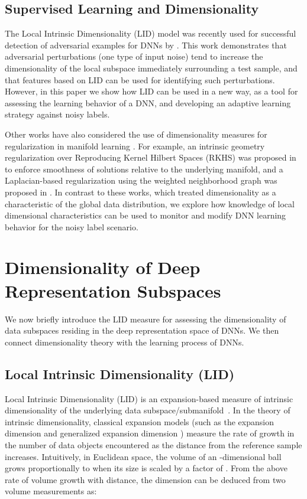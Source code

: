 \documentclass{article}
\begin{document}
\subsection{Supervised Learning and Dimensionality}

The Local Intrinsic Dimensionality (LID) model \cite{houle2017local1} was recently used for successful detection of adversarial examples for DNNs by \cite{ma2018characterizing}. This work demonstrates that adversarial perturbations (one type of input noise) tend to increase the dimensionality of the local subspace immediately surrounding a test sample, and that features based on LID can be used for identifying such perturbations.
However, in this paper we show how LID can be used in a new way, as a tool for assessing the learning behavior of a DNN, and developing an adaptive learning strategy against noisy labels.

Other works have also considered the use of dimensionality measures for regularization in manifold learning \cite{roweis2000nonlinear,belkin2004regularization,belkin2006manifold}. For example, an intrinsic geometry regularization over Reproducing Kernel Hilbert Spaces (RKHS) was proposed in \cite{belkin2006manifold} to enforce smoothness of solutions relative to the underlying manifold, and a Laplacian-based regularization using the weighted neighborhood graph was proposed in \cite{belkin2004regularization}. In contrast to these works, which treated dimensionality as a characteristic of the global data distribution, we explore how knowledge of local dimensional characteristics can be used to monitor and modify DNN learning behavior for the noisy label scenario. 






\section{Dimensionality of Deep Representation Subspaces}
We now briefly introduce the LID measure for assessing the dimensionality of data subspaces residing in the deep representation space of DNNs. We then connect dimensionality theory with the learning process of DNNs.

\subsection{Local Intrinsic Dimensionality (LID)}
Local Intrinsic Dimensionality (LID) is an expansion-based measure of intrinsic dimensionality of the underlying data subspace/submanifold~\cite{houle2017local1}. 
In the theory of intrinsic dimensionality, classical
expansion models (such as the expansion dimension \cite{karger2002finding} and generalized expansion dimension \cite{HouleKN12}) measure the rate of growth in the number of data objects encountered as the distance from the reference sample increases. Intuitively, in Euclidean space, the volume of an -dimensional ball grows proportionally to  when its size is scaled by a factor of . From the above rate of volume growth with distance, the dimension  can be deduced from two volume measurements as: 
\end{document}

